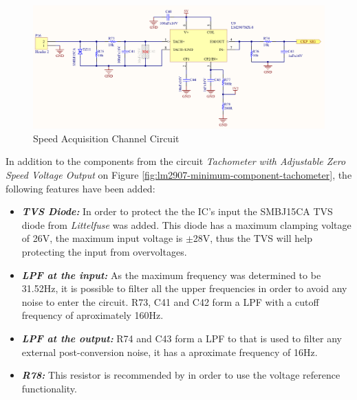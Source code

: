 			\begin{figure}[htbp]
				\centering
				\includegraphics[width=1\textwidth]{figuras/fig-ckp-conditioning-circuit.png}
				\caption{Speed Acquisition Channel Circuit}
				\label{fig:ckp-conditioning-circuit}
			\end{figure}

			In addition to the components from the circuit \textit{Tachometer with Adjustable Zero Speed Voltage Output} on Figure \ref{fig:lm2907-minimum-component-tachometer}, the following features have been added:

			\begin{itemize}
				\item\textit{\textbf{TVS Diode:}} In order to protect the the IC's input the SMBJ15CA TVS diode from \textit{Littelfuse} was added. This diode has a maximum clamping voltage of 26V, the maximum input voltage is $\pm$28V, thus the TVS will help protecting the input from overvoltages.\label{itm:ckp-circuit-tvs}
				\item\textit{\textbf{LPF at the input:}} As the maximum frequency was determined to be 31.52Hz, it is possible to filter all the upper frequencies in order to avoid any noise to enter the circuit. R73, C41 and C42 form a LPF with a cutoff frequency of aproximately 160Hz.
				\item\textit{\textbf{LPF at the output:}} R74 and C43 form a LPF to that is used to filter any external post-conversion noise, it has a aproximate frequency of 16Hz.\label{itm:ckp-circuit-lpf-output} 
				\item\textit{\textbf{R78:}} This resistor is recommended by \cite{lm2907-datasheet} in order to use the voltage reference functionality.
			\end{itemize}

